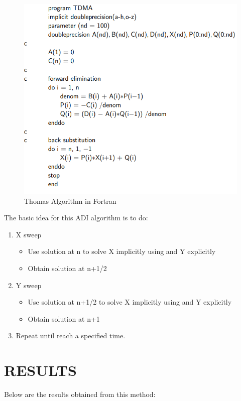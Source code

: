 \documentclass[12pt]{article}
\begin{document}
	
	\begin{figure}[H]
		\hfill\includegraphics[width=150mm,height= 100mm]{thomaspseudo.png}\hspace*{\fill}
		\caption{Thomas Algorithm in Fortran}
	\end{figure}
	The basic idea for this ADI algorithm is to do: 
	\begin{enumerate}
		\item X sweep
		\begin{itemize}
			\item Use solution at n to solve X implicitly using and Y explicitly
			\item Obtain solution at n+1/2
		\end{itemize}
		\item Y sweep
		\begin{itemize}		
			\item Use solution at n+1/2 to solve X implicitly using and Y explicitly
			\item Obtain solution at n+1
		\end{itemize}
		\item Repeat until reach a specified time.
			
	\end{enumerate}

	\newpage	
	\section{RESULTS}
	Below are the results obtained from this method: 
\end{document}
